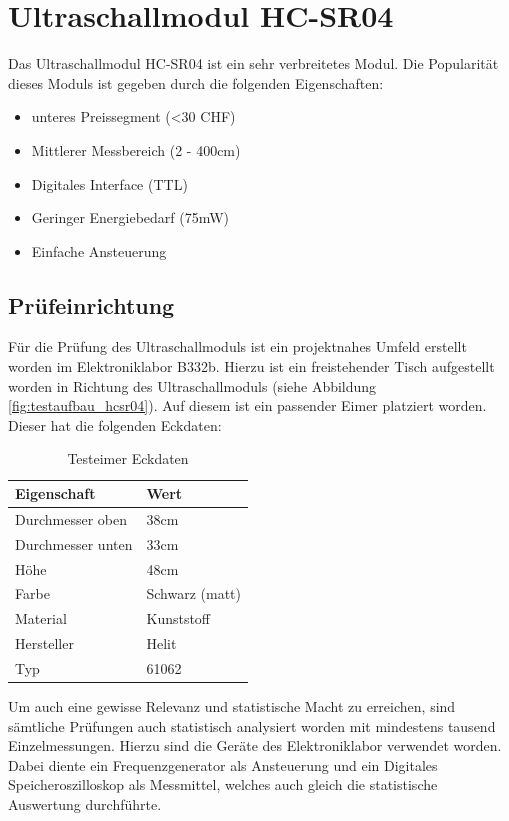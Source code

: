 \section{Ultraschallmodul HC-SR04}
Das Ultraschallmodul HC-SR04 ist ein sehr verbreitetes Modul. Die Popularität
dieses Moduls ist gegeben durch die folgenden Eigenschaften:
\begin{itemize}
	\item unteres Preissegment (<30 CHF)
	\item Mittlerer Messbereich (2 - 400cm)
	\item Digitales Interface (TTL)
	\item Geringer Energiebedarf (75mW)
	\item Einfache Ansteuerung
\end{itemize}

\subsection{Prüfeinrichtung}
Für die Prüfung des Ultraschallmoduls ist ein projektnahes Umfeld erstellt 
worden im Elektroniklabor B332b. Hierzu ist ein freistehender Tisch 
aufgestellt worden in Richtung des Ultraschallmoduls (siehe Abbildung 
\ref{fig:testaufbau_hcsr04}). Auf diesem ist ein passender Eimer platziert
worden. Dieser hat die folgenden Eckdaten:

\begin{table}[h!]
	\centering
	\begin{tabular}{l l}
		Eigenschaft		& Wert \\
		\hline
		Durchmesser oben	& 38cm \\
		Durchmesser unten	& 33cm \\
		Höhe 			& 48cm \\
		Farbe 			& Schwarz (matt) \\
		Material		& Kunststoff \\
		Hersteller		& Helit \\
		Typ			& 61062
	\end{tabular}
	\caption{Testeimer Eckdaten}
	\label{tab:testeimer}
\end{table}

Um auch eine gewisse Relevanz und statistische Macht zu erreichen, sind 
sämtliche Prüfungen auch statistisch analysiert worden mit mindestens tausend
Einzelmessungen. Hierzu sind die Geräte des Elektroniklabor verwendet worden.
Dabei diente ein Frequenzgenerator als Ansteuerung und ein Digitales 
Speicheroszilloskop als Messmittel, welches auch gleich die statistische
Auswertung durchführte.

